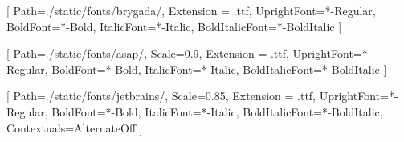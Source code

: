 \usepackage{microtype}
\usepackage{fontspec}

[
    Path=./static/fonts/brygada/,
    Extension = .ttf,
    UprightFont=*-Regular,
    BoldFont=*-Bold,
    ItalicFont=*-Italic,
    BoldItalicFont=*-BoldItalic
    ]


\setsansfont{Asap}[
    Path=./static/fonts/asap/,
    Scale=0.9,
    Extension = .ttf,
    UprightFont=*-Regular,
    BoldFont=*-Bold,
    ItalicFont=*-Italic,
    BoldItalicFont=*-BoldItalic
    ]

\setmonofont{JetBrainsMono}[
    Path=./static/fonts/jetbrains/,
    Scale=0.85,
    Extension = .ttf,
    UprightFont=*-Regular,
    BoldFont=*-Bold,
    ItalicFont=*-Italic,
    BoldItalicFont=*-BoldItalic,
    Contextuals=AlternateOff
    ]
    
\renewcommand{\familydefault}{\sfdefault}
